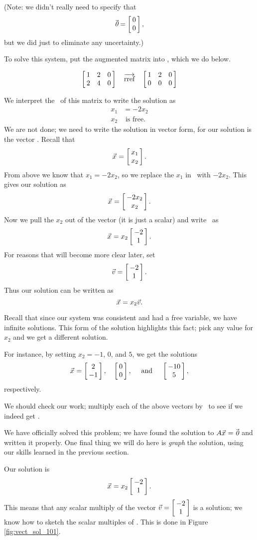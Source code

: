 {(Note: we didn't really need to specify that $$\zero = \bmx{c}0\\0\emx,$$ but we did just to eliminate any uncertainty.)

To solve this system, put the augmented matrix into \rref, which we do below.

$$\bmx{ccc} 1&2&0\\2&4&0\emx \quad \arref \quad \bmx{ccc} 1&2&0\\0&0&0\emx$$


We interpret the \rref\ of this matrix to write the solution as \begin{align*} x_1 &= -2x_2\\x_2 &\text{ is free.}\end{align*} We are not done; we need to write the solution in vector form, for our solution is the vector \vx. Recall that $$\vx = \bmx{c} x_1\\x_2\emx.$$ From above we know that $x_1 = -2x_2$, so we replace the $x_1$ in \vx\ with $-2x_2$. This gives our solution as $$\vx = \bmx{c} -2x_2\\x_2\emx.$$ Now we pull the $x_2$ out of the vector (it is just a scalar) and write \vx\ as $$\vx = x_2\bmx{c}-2\\1\emx.$$ For reasons that will become more clear later, set $$\vv = \bmx{c} -2\\1\emx.$$ Thus our solution can be written as $$\vx = x_2\vv.$$

\drawexampleline
Recall that since our system was consistent and had a free variable, we have infinite solutions. This form of the solution highlights this fact; pick any value for $x_2$ and we get a different solution. 


For instance, by setting $x_2 = -1$, $0$, and $5$, we get the solutions $$\vx = \bmx{c}2\\-1\emx, \quad \bmx{c}0\\0\emx,\quad \text{ and }\quad \bmx{c} -10\\5\emx,$$ respectively. 

We should check our work; multiply each of the above vectors by \tta\ to see if we indeed get \zero.

We have officially solved this problem; we have found the solution to $\tta\vx=\zero$ and written it properly. One final thing we will do here is \textit{graph} the solution, using our skills learned in the previous section.

Our solution is $$\vx = x_2\bmx{c}-2\\1\emx.$$ This means that any scalar multiply of the vector $\vv = \bmx{c} -2\\1\emx$ is a solution; we know how to sketch the scalar multiples of \vv. This is done in Figure \ref{fig:vect_sol_101}. 

}

